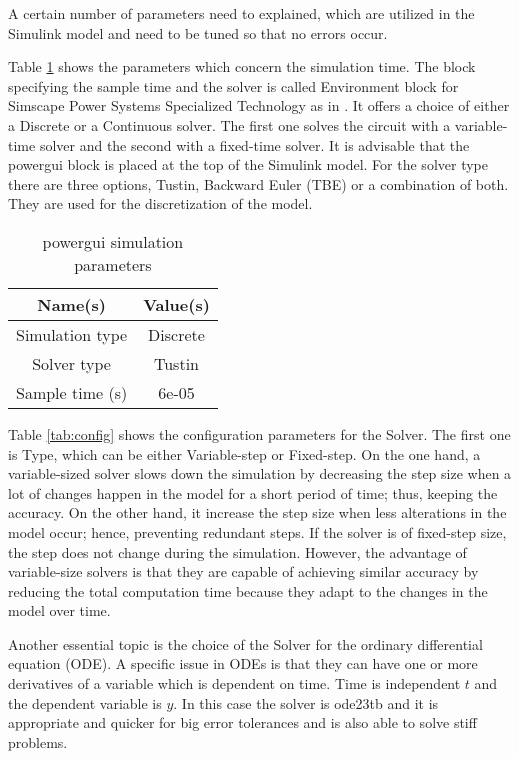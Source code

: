 A certain number of parameters need to explained, which are utilized in the Simulink model and need to be tuned so that no errors occur. 

Table \ref{tab:powergui} shows the parameters which concern the simulation time. The block specifying the sample time and the solver is called Environment block for Simscape Power Systems Specialized Technology as in \citet{powerguiMatlab}. It offers a choice of either a Discrete or a Continuous solver. The first one solves the circuit with a variable-time solver and the second with a fixed-time solver. It is advisable that the powergui block is placed at the top of the Simulink model. For the solver type there are three options, Tustin, Backward Euler (TBE) or a combination of both. They are used for the discretization of the model.

\begin{table}
\centering
\begin{tabular}{ |c|c| } 
 \hline
 Name(s) & Value(s) \\
 \hline\hline
 Simulation type & Discrete  \\ 
 Solver type & Tustin \\ 
 Sample time (s) & 6e-05 \\ 
 \hline
\end{tabular}
\caption{powergui simulation parameters }
\label{tab:powergui}
\end{table}

Table \ref{tab:config} shows the configuration parameters for the Solver. The first one is Type, which can be either Variable-step or Fixed-step. On the one hand, a variable-sized solver slows down the simulation by decreasing the step size when a lot of changes happen in the model for a short period of time; thus, keeping the accuracy. On the other hand, it increase the step size when less alterations in the model occur; hence, preventing redundant steps. If the solver is of fixed-step size, the step does not change during the simulation. However, the advantage of variable-size solvers is that they are capable of achieving similar accuracy by reducing the total computation time because they adapt to the changes in the model over time.

Another essential topic is the choice of the Solver for the ordinary differential equation (ODE). A specific issue in ODEs is that they can have one or more derivatives of a variable which is dependent on time. Time is independent $t$ and the dependent variable is $y$. In this case the solver is ode23tb and it is appropriate and quicker for big error tolerances and is also able to solve stiff problems.

